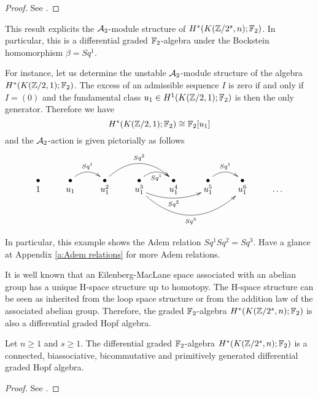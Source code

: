 \begin{proof}
See \cite[Th\'eor\`eme 2, p. 203 and Th\'eor\`eme 4, p. 206]{Se53}.
\end{proof}

This result explicits the $\mathcal{A}_2$-module structure of $H^*(K(\mathbb{Z}/2^s,n);\mathbb{F}_2)$. In particular, this is a differential graded $\mathbb{F}_2$-algebra under the Bockstein homomorphism $\beta=Sq^1$. 

For instance, let us determine the unstable $\mathcal{A}_2$-module structure of the algebra $H^*(K(\mathbb{Z}/2,1);\mathbb{F}_2)$. The excess of an admissible sequence $I$ is zero if and only if $I=(0)$ and the fundamental class $u_1\in H^1(K(\mathbb{Z}/2,1);\mathbb{F}_2)$ is then the only generator. Therefore we have
$$
H^*(K(\mathbb{Z}/2,1);\mathbb{F}_2)\cong \mathbb{F}_2[u_1]
$$ and the $\mathcal{A}_2$-action is given pictorially as follows
$$\xymatrix@R=-0.1cm{
\bullet &\bullet\ar@/^10pt/[r]^-{Sq^1} &\bullet\ar@/^20pt/[rr]^-{Sq^2} &\bullet\ar@/^10pt/[r]_-{Sq^1} &\bullet &\bullet\ar@/^10pt/[r]^-{Sq^1} &\bullet \\
1 &u_1 &u_1^2 &u_1^3\ar@/_10pt/[rr]_-{Sq^2}\ar@/_30pt/[rrr]_-{Sq^3} &u_1^4 &u_1^5 &u_1^6 &\dots
}$$

In particular, this example shows the Adem relation $Sq^1Sq^2=Sq^3$. Have a glance at Appendix \ref{a:Adem relations} for more Adem relations.

\bigskip
It is well known that an Eilenberg-MacLane space associated with an abelian group has a unique H-space structure up to homotopy. The H-space structure can be seen as inherited from the loop space structure or from the addition law of the associated abelian group. Therefore, the graded $\mathbb{F}_2$-algebra $H^*(K(\mathbb{Z}/2^s,n);\mathbb{F}_2)$ is also a differential graded Hopf algebra. 

\begin{thm}\label{t:Hopf structure of K(G,n) cohomology}
Let $n\geq1$ and $s\geq1$. The differential graded $\mathbb{F}_2$-algebra $H^*(K(\mathbb{Z}/2^s,n);\mathbb{F}_2)$ is a connected, biassociative, bicommutative and primitively generated differential graded Hopf algebra.
\end{thm}

\begin{proof}
See \cite[pp. 54-55]{Sm70}.
\end{proof}

